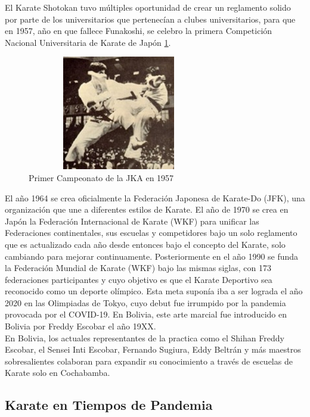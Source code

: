 El Karate Shotokan tuvo múltiples oportunidad de crear un reglamento solido por parte de los universitarios que pertenecían a clubes universitarios, para que en 1957, año en que fallece Funakoshi, se celebro la primera Competición Nacional Universitaria de Karate de Japón \ref{jkachamp}.

\begin{figure}[t!]
	\centering
	\includegraphics[width=8cm,height=5cm,]{./Images/1stJKAChampionships1957.png}
	\caption{Primer Campeonato de la JKA en 1957}
	\label{jkachamp}
\end{figure}

El año 1964 se crea oficialmente la Federación Japonesa de Karate-Do (JFK), una organización que une a diferentes estilos de Karate. El año de 1970 se crea en Japón la Federación Internacional de Karate (WKF) para unificar las Federaciones continentales, sus escuelas y competidores bajo un solo reglamento que es actualizado cada año desde entonces bajo el concepto del Karate, solo cambiando para mejorar continuamente. Posteriormente en el año 1990 se funda la Federación Mundial de Karate (WKF) bajo las mismas siglas, con 173 federaciones participantes y cuyo objetivo es que el Karate Deportivo sea reconocido como un deporte olímpico. Esta meta suponía iba a ser lograda el año 2020 en las Olimpiadas de Tokyo, cuyo debut fue irrumpido por la pandemia provocada por el COVID-19. En Bolivia, este arte marcial fue introducido en Bolivia por Freddy Escobar  el año 19XX\cite{Inti}. \\

En Bolivia, los actuales representantes de la practica como el Shihan Freddy Escobar, el Sensei Inti Escobar, Fernando Sugiura, Eddy Beltrán y más maestros sobresalientes colaboran para expandir su conocimiento a través de escuelas de Karate solo en Cochabamba.


\subsection{Karate en Tiempos de Pandemia}

